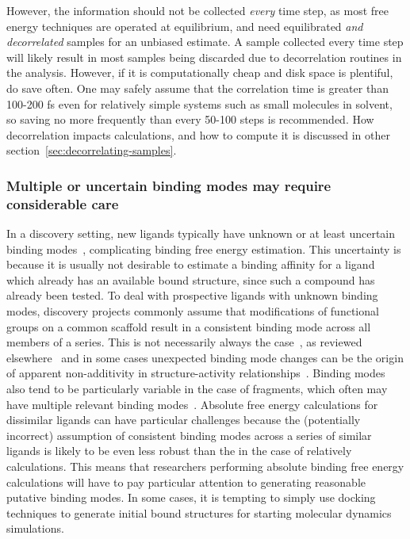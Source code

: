 \documentclass[9pt,bestpractices]{livecoms}
\begin{document}
However, the information should not be collected \textit{every} time step, as most free energy techniques are operated at equilibrium, and need equilibrated \textit{and decorrelated} samples for an unbiased estimate.
A sample collected every time step will likely result in most samples being discarded due to decorrelation routines in the analysis. However, if it is computationally cheap and disk space is plentiful, do save often. One may safely assume that the correlation time is greater than 100-200 fs even for relatively simple systems such as small molecules in solvent, so saving no more frequently than every 50-100 steps is recommended. 
How decorrelation impacts calculations, and how to compute it is discussed in other section~\ref{sec:decorrelating-samples}. 
%
\subsubsection{Multiple or uncertain binding modes may require considerable care}
\label{sec:multiple_binding_modes}
In a discovery setting, new ligands typically have unknown or at least uncertain binding modes~\cite{kaus2015how, plountprice2000analysis,mobley2009binding,calabro2016elucidation},  complicating binding free energy estimation.
This uncertainty is because it is usually not desirable to estimate a binding affinity for a ligand which already has an available bound structure, since such a compound has already been tested.
To deal with prospective ligands with unknown binding modes, discovery projects commonly assume that modifications of functional groups on a common scaffold result in a consistent binding mode across all members of a series.
This is not necessarily always the case~\cite{kaus2015how}, as reviewed elsewhere~\cite{mobley2009binding} and in some cases unexpected binding mode changes can be the origin of apparent non-additivity in structure-activity relationships~\cite{calabro2016elucidation}.
Binding modes also tend to be particularly variable in the case of fragments, which often may have multiple relevant binding modes~\cite{}.
%
Absolute free energy calculations for dissimilar ligands can have particular challenges because the (potentially incorrect) assumption of consistent binding modes across a series of similar ligands is likely to be even less robust than the in the case of relatively calculations.
This means that researchers performing absolute binding free energy calculations will have to pay particular attention to generating reasonable putative binding modes.
%
In some cases, it is tempting to simply use docking techniques to generate initial bound structures for starting molecular dynamics simulations.
\end{document}
